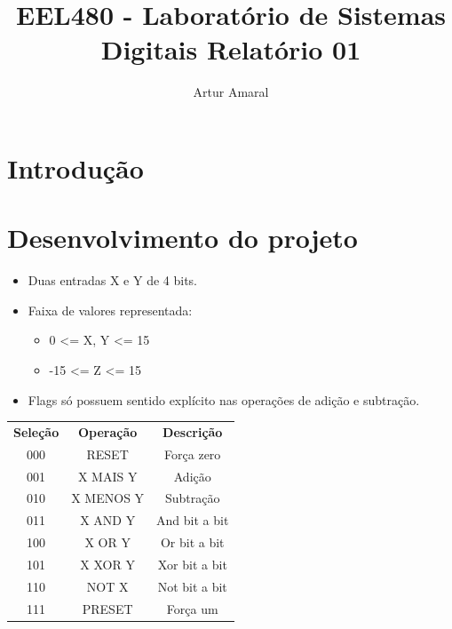 \documentclass{article}
\author{Artur Amaral}
\title{EEL480 - Laboratório de Sistemas Digitais Relatório 01}
\begin{document}
\maketitle

\section{Introdução}

\section{Desenvolvimento do projeto}
\begin{itemize}
    \item Duas entradas X e Y de 4 bits.
    \item Faixa de valores representada:
        \begin{itemize}
            \item  0 <= X, Y <= 15
            \item  -15 <= Z <= 15
        \end{itemize}
    \item Flags só possuem sentido explícito nas operações de adição e subtração.
\end{itemize}

\begin{center}
    \begin{tabular}{ c|c|c }

        \textbf{Seleção} & \textbf{Operação} & \textbf{Descrição} \\
    000 & RESET & Força zero\\
    001 & X MAIS Y & Adição\\
    010 & X MENOS Y & Subtração\\
    011 & X AND Y & And bit a bit\\
    100 & X OR Y & Or bit a bit\\
    101 & X XOR Y & Xor bit a bit\\
    110 & NOT X & Not bit a bit\\
    111 & PRESET & Força um\\


\end{tabular}
\end{center}

\begin{verbatim}
\end{verbatim}
\end{document}
